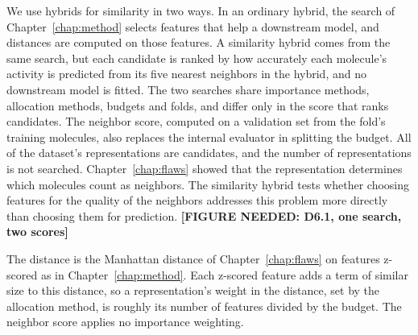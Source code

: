 We use hybrids for similarity in two ways. In an ordinary hybrid, the search of Chapter~\ref{chap:method} selects features that help a downstream model, and distances are computed on those features. A similarity hybrid comes from the same search, but each candidate is ranked by how accurately each molecule's activity is predicted from its five nearest neighbors in the hybrid, and no downstream model is fitted. The two searches share importance methods, allocation methods, budgets and folds, and differ only in the score that ranks candidates. The neighbor score, computed on a validation set from the fold's training molecules, also replaces the internal evaluator in splitting the budget. All of the dataset's representations are candidates, and the number of representations is not searched. Chapter~\ref{chap:flaws} showed that the representation determines which molecules count as neighbors. The similarity hybrid tests whether choosing features for the quality of the neighbors addresses this problem more directly than choosing them for prediction. \textbf{[FIGURE NEEDED: D6.1, one search, two scores]}

The distance is the Manhattan distance of Chapter~\ref{chap:flaws} on features z-scored as in Chapter~\ref{chap:method}. Each z-scored feature adds a term of similar size to this distance, so a representation's weight in the distance, set by the allocation method, is roughly its number of features divided by the budget. The neighbor score applies no importance weighting.

